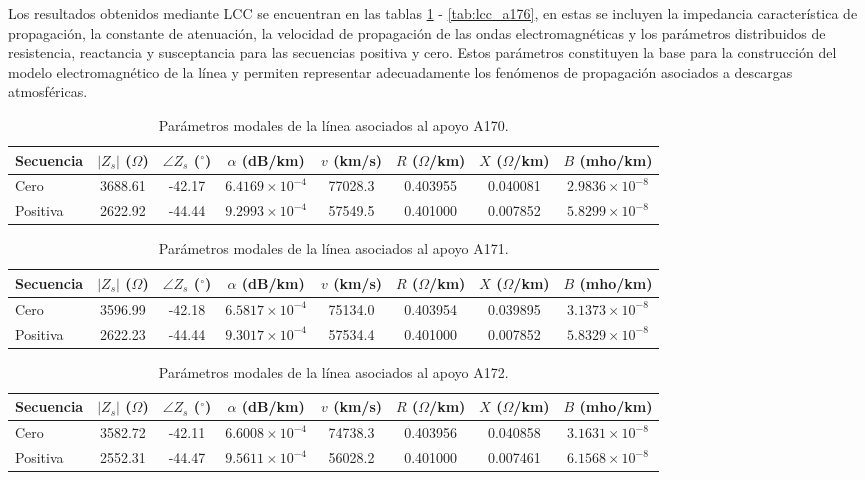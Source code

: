 \documentclass[12pt,letterpaper]{article}
\begin{document}
Los resultados obtenidos mediante LCC se encuentran en las tablas \ref{tab:lcc_a170} - \ref{tab:lcc_a176}, en estas se incluyen la impedancia característica de propagación, la constante de atenuación, la velocidad de propagación de las ondas electromagnéticas y los parámetros distribuidos de resistencia, reactancia y susceptancia para las secuencias positiva y cero. Estos parámetros constituyen la base para la construcción del modelo electromagnético de la línea y permiten representar adecuadamente los fenómenos de propagación asociados a descargas atmosféricas.

\begin{table}[H]
\centering
\caption{Parámetros modales de la línea asociados al apoyo A170.}
\label{tab:lcc_a170}
\renewcommand{\arraystretch}{1.2}
\begin{tabular}{lccccccc}
\toprule
Secuencia &
$\left|Z_s\right|$ ($\Omega$) &
$\angle Z_s$ ($^\circ$) &
$\alpha$ (dB/km) &
$v$ (km/s) &
$R$ ($\Omega$/km) &
$X$ ($\Omega$/km) &
$B$ (mho/km) \\
\midrule
Cero     & 3688.61 & -42.17 & $6.4169\times10^{-4}$ & 77028.3 & 0.403955 & 0.040081 & $2.9836\times10^{-8}$ \\
Positiva & 2622.92 & -44.44 & $9.2993\times10^{-4}$ & 57549.5 & 0.401000 & 0.007852 & $5.8299\times10^{-8}$ \\
\bottomrule
\end{tabular}
\end{table}
\begin{table}[H]
\centering
\caption{Parámetros modales de la línea asociados al apoyo A171.}
\label{tab:lcc_a171}
\renewcommand{\arraystretch}{1.2}
\begin{tabular}{lccccccc}
\toprule
Secuencia &
$\left|Z_s\right|$ ($\Omega$) &
$\angle Z_s$ ($^\circ$) &
$\alpha$ (dB/km) &
$v$ (km/s) &
$R$ ($\Omega$/km) &
$X$ ($\Omega$/km) &
$B$ (mho/km) \\
\midrule
Cero     & 3596.99 & -42.18 & $6.5817\times10^{-4}$ & 75134.0 & 0.403954 & 0.039895 & $3.1373\times10^{-8}$ \\
Positiva & 2622.23 & -44.44 & $9.3017\times10^{-4}$ & 57534.4 & 0.401000 & 0.007852 & $5.8329\times10^{-8}$ \\
\bottomrule
\end{tabular}
\end{table}
\begin{table}[H]
\centering
\caption{Parámetros modales de la línea asociados al apoyo A172.}
\label{tab:lcc_a172}
\renewcommand{\arraystretch}{1.2}
\begin{tabular}{lccccccc}
\toprule
Secuencia &
$\left|Z_s\right|$ ($\Omega$) &
$\angle Z_s$ ($^\circ$) &
$\alpha$ (dB/km) &
$v$ (km/s) &
$R$ ($\Omega$/km) &
$X$ ($\Omega$/km) &
$B$ (mho/km) \\
\midrule
Cero     & 3582.72 & -42.11 & $6.6008\times10^{-4}$ & 74738.3 & 0.403956 & 0.040858 & $3.1631\times10^{-8}$ \\
Positiva & 2552.31 & -44.47 & $9.5611\times10^{-4}$ & 56028.2 & 0.401000 & 0.007461 & $6.1568\times10^{-8}$ \\
\bottomrule
\end{tabular}
\end{table}
\end{document}
